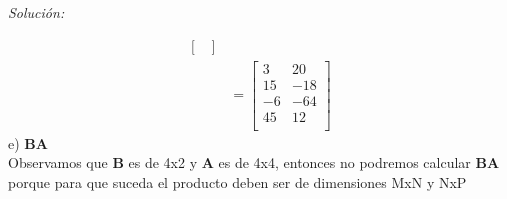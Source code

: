 \documentclass[12pt]{article}
\newenvironment{sol}
    {\emph{Solución:}
    }
    {
    }
\begin{document}
\begin{sol}
\begin{align*}
\begin{bmatrix}
\end{bmatrix} \\
&=
\begin{bmatrix}
3 & 20 \\
15 & -18 \\
-6 & -64 \\
45 & 12 \\
\end{bmatrix}
\end{align*}
e) \textbf{BA} \\
Observamos que \textbf{B} es de 4x2 y \textbf{A} es de 4x4, entonces no podremos calcular \textbf{B}\textbf{A} porque para que suceda el producto deben ser de dimensiones MxN y NxP
\end{sol}







\end{document}
